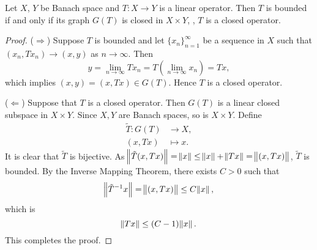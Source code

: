 \begin{thm}
Let $X$, $Y$ be Banach space and $T: X \to Y$ is a linear operator. 
Then $T$ is bounded if and only if its graph $G(T)$ is closed in 
$X \times Y$, \ie, $T$ is a closed operator. 
\end{thm}
\begin{proof}
($\Rightarrow$)
Suppose $T$ is bounded and let $\{ x_n \}_{n=1}^{\infty}$ be a sequence in 
$X$ such that $(x_n, Tx_n) \to (x, y)$ as $n \to \infty$. 
Then 
\begin{equation*}
    y = \lim_{n \to \infty} T x_n 
    = T\left( \lim_{n \to \infty} x_n \right) 
    = Tx, 
\end{equation*}
which implies $(x, y) = (x, Tx) \in G(T)$. 
Hence $T$ is a closed operator. 

($\Leftarrow$)
Suppose that $T$ is a closed operator. 
Then $G(T)$ is a linear closed subspace in $X \times Y$. 
Since $X, Y$ are Banach spaces, so is $X \times Y$. 
Define 
\begin{equation*}
    \begin{aligned}
        \tilde T: G(T) &\to X, \\
        (x, Tx) &\mapsto x. 
    \end{aligned}
\end{equation*}
It is clear that $\tilde T$ is bijective. 
As $\norm{\tilde T (x, Tx)} = \norm{x} \le \norm{x} + \norm{Tx} = 
\norm{(x, Tx)}$, $\tilde T$ is bounded. 
By the Inverse Mapping Theorem, there exists $C > 0$ such that 
\begin{equation*}
    \norm{\tilde T^{-1} x} = \norm{(x, Tx)} \le C \norm{x}, 
\end{equation*}
which is 
\begin{equation*}
    \norm{Tx} \le (C - 1) \norm{x}. 
\end{equation*}
This completes the proof. 
\end{proof}
